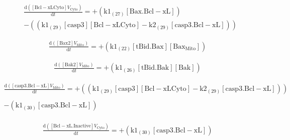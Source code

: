 \documentclass[a4paper,12pt]{article} %
\newcommand{\M}[1]{\mathrm{#1}}
\begin{document}
\begin{align*}
& \frac {\M{d}( {{\M{[Bcl-xL{Cyto}]}}    {V}_{\M{Cyto}} } ) }  {\M{d}{t} }  =  {  +  ( {{\M{k1}}_{\M{(27)}}    {\M{[Bax.Bcl-xL]}} } ) } \\  
&  {  -  (( {{\M{k1}}_{\M{(29)}}    {\M{[casp3]}}    {\M{[Bcl-xL{Cyto}]}}  -  {\M{k2}}_{\M{(29)}}    {\M{[casp3.Bcl-xL]}} } )) }
\end{align*}

\begin{equation}
\begin{split}
\frac {\M{d}( {{\M{[Bax2]}}    {V}_{\M{Mito}} } ) }  {\M{d}{t} }  =  {  +  ( {{\M{k1}}_{\M{(22)}}    {\M{[tBid.Bax]}}    {\M{[Bax_{Mito}]}} } ) }
\end{split}
\end{equation}

\begin{equation}
\begin{split}
\frac {\M{d}( {{\M{[Bak2]}}    {V}_{\M{Mito}} } ) }  {\M{d}{t} }  =  {  +  ( {{\M{k1}}_{\M{(26)}}    {\M{[tBid.Bak]}}    {\M{[Bak]}} } ) }
\end{split}
\end{equation}

\begin{equation}
\begin{split}
\frac {\M{d}( {{\M{[casp3.Bcl-xL]}}    {V}_{\M{Mito}} } ) }  {\M{d}{t} }  =  {  +  (( {{\M{k1}}_{\M{(29)}}    {\M{[casp3]}}    {\M{[Bcl-xL{Cyto}]}}  -  {\M{k2}}_{\M{(29)}}    {\M{[casp3.Bcl-xL]}} } )) } \\ 
  \\ 
   {  -  ( {{\M{k1}}_{\M{(30)}}    {\M{[casp3.Bcl-xL]}} } ) } 
\end{split}
\end{equation}


\begin{equation}
\begin{split}
\begin{flalign}
\frac {\M{d}( {{\M{[Bcl-xL.Inactive]}}    {V}_{\M{Cyto}} } ) }  {\M{d}{t} }  =  {  +  ( {{\M{k1}}_{\M{(30)}}    {\M{[casp3.Bcl-xL]}} } ) } 
\end{flalign}
\end{split}
\end{equation}
\end{document}
